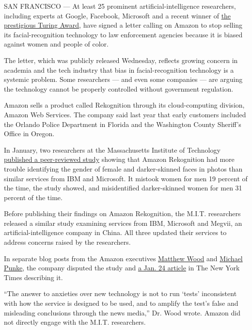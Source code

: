SAN FRANCISCO --- At least 25 prominent artificial-intelligence
researchers, including experts at Google, Facebook, Microsoft and a
recent winner of
\href{https://www.nytimes3xbfgragh.onion/2019/03/27/technology/turing-award-ai.html}{the
prestigious Turing Award}, have signed a letter calling on Amazon to
stop selling its facial-recognition technology to law enforcement
agencies because it is biased against women and people of color.

The letter, which was publicly released Wednesday, reflects growing
concern in academia and the tech industry that bias in
facial-recognition technology is a systemic problem. Some researchers
--- and even some companies --- are arguing the technology cannot be
properly controlled without government regulation.

Amazon sells a product called Rekognition through its cloud-computing
division, Amazon Web Services. The company said last year that early
customers included the Orlando Police Department in Florida and the
Washington County Sheriff's Office in Oregon.

In January, two researchers at the Massachusetts Institute of Technology
\href{https://www.nytimes3xbfgragh.onion/2019/01/24/technology/amazon-facial-technology-study.html}{published
a peer-reviewed study} showing that Amazon Rekognition had more trouble
identifying the gender of female and darker-skinned faces in photos than
similar services from IBM and Microsoft. It mistook women for men 19
percent of the time, the study showed, and misidentified darker-skinned
women for men 31 percent of the time.

Before publishing their findings on Amazon Rekognition, the M.I.T.
researchers released a similar study examining services from IBM,
Microsoft and Megvii, an artificial-intelligence company in China. All
three updated their services to address concerns raised by the
researchers.

In separate blog posts from the Amazon executives
\href{https://aws.amazon.com/blogs/machine-learning/thoughts-on-recent-research-paper-and-associated-article-on-amazon-rekognition/}{Matthew
Wood} and
\href{https://aws.amazon.com/blogs/machine-learning/some-thoughts-on-facial-recognition-legislation/}{Michael
Punke}, the company disputed the study and
\href{https://www.nytimes3xbfgragh.onion/2019/01/24/technology/amazon-facial-technology-study.html}{a
Jan. 24 article} in The New York Times describing it.

``The answer to anxieties over new technology is not to run `tests'
inconsistent with how the service is designed to be used, and to amplify
the test's false and misleading conclusions through the news media,''
Dr. Wood wrote. Amazon did not directly engage with the M.I.T.
researchers.

